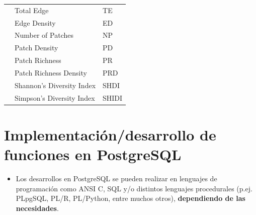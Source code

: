 \begin{table}[]
\begin{tabular}{lll}
                           & Total Edge                           & TE                   \\
                           & Edge Density                         & ED                   \\
                           & Number of Patches                    & NP                   \\
                           & Patch Density                        & PD                   \\
                           & Patch Richness                       & PR                   \\
                           & Patch Richness Density               & PRD                  \\
                           & Shannon's Diversity Index            & SHDI                 \\
                           & Simpson's Diversity Index            & SHIDI                \\ \hline
\end{tabular}
\end{table}


\section{Implementación/desarrollo de funciones en PostgreSQL}

\begin{graybox}
\begin{itemize}
\item Los desarrollos en PostgreSQL se pueden realizar en lenguajes de programación como ANSI C, SQL y/o distintos lenguajes procedurales (p.ej. PLpgSQL, PL/R, PL/Python, entre muchos otros), \textbf{dependiendo de las necesidades}.
\end{itemize}
\end{graybox}

